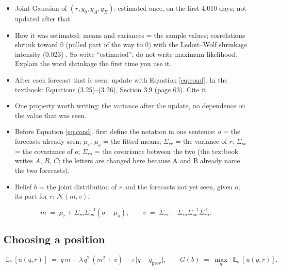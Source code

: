 \documentclass{article}
\newenvironment{pts}{\begin{itemize}[nosep,leftmargin=1.15em,topsep=1pt]}{\end{itemize}}
\newcommand{\qprev}{q_{\mathrm{prev}}}
\DeclareMathOperator{\E}{\mathbb{E}}
\begin{document}
\begin{note}
\begin{pts}
\item Joint Gaussian of $(r, y_0, y_A, y_B)$: estimated once, on the first 4{,}010 days; not updated after that.
\item How it was estimated: means and variances = the sample values; correlations shrunk toward 0 (pulled part of the way to 0) with the Ledoit--Wolf shrinkage intensity (0.023) \citep{ledoit2004wellconditioned}. So write ``estimated''; do not write maximum likelihood. Explain the word shrinkage the first time you use it.
\item After each forecast that is seen: update with Equation \eqref{eq:cond}. In the textbook: Equations (3.25)--(3.26), Section 3.9 (page 63). Cite it.
\item One property worth writing: the variance after the update, no dependence on the value that was seen.
\item Before Equation \eqref{eq:cond}, first define the notation in one sentence: $o$ = the forecasts already seen; $\mu_r$, $\mu_o$ = the fitted means; $\Sigma_{rr}$ = the variance of $r$; $\Sigma_{oo}$ = the covariance of $o$; $\Sigma_{ro}$ = the covariance between the two (the textbook writes $A$, $B$, $C$; the letters are changed here because A and B already name the two forecasts).
\item Belief $b$ = the joint distribution of $r$ and the forecasts not yet seen, given $o$; its part for $r$: $\mathcal{N}(m, v)$.
\end{pts}
\end{note}

\begin{equation}
m \;=\; \mu_r + \Sigma_{ro} \Sigma_{oo}^{-1} (o - \mu_o), \qquad
v \;=\; \Sigma_{rr} - \Sigma_{ro} \Sigma_{oo}^{-1} \Sigma_{ro}^{\top}.
\label{eq:cond}
\end{equation}

\subsection{Choosing a position}

\begin{equation}
\E_b\!\left[u(q, r)\right] \;=\; q\,m - \lambda\,q^{2}\,(m^{2} + v) - \tau\,\lvert q - \qprev\rvert ,
\qquad
G(b) \;=\; \max_{q}\; \E_b\!\left[u(q, r)\right].
\label{eq:stop}
\end{equation}
\end{document}
